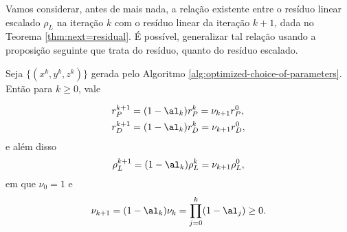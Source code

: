 


Vamos considerar, antes de mais nada, a relação existente entre o resíduo linear escalado $\rho_L$ na iteração $k$ com o resíduo 
linear da iteração $k+1$, dada no Teorema \ref{thm:next=residual}. É possível, generalizar tal relação usando a  proposição seguinte que trata do resíduo, quanto do resíduo escalado. 
\begin{prop}\label{prop:nu_k}
 Seja $\{(x^k,y^k,z^k)\}$ gerada pelo Algoritmo \ref{alg:optimized-choice-of-parameters}. Então para $k\geq0$, vale  

\begin{equation}
\label{eq:residual-norm-relation-nonscaled}
\begin{aligned}
 r_P^{k+1}  & = (1-\alk) r_P^{k} = \nu_{k+1}  r_P^{0}, \\
  r_D^{k+1}  & = (1-\alk) r_D^{k} = \nu_{k+1}  r_D^{0}, \\
\end{aligned}
\end{equation}
e além disso
\begin{equation}
\label{eq:residual-norm-relation}
 \rho_L^{k+1}  = (1-\alk) \rho_L^{k} = \nu_{k+1}  \rho_L^{0},
\end{equation}
em que  $\nu_0 = 1$ e 
\begin{equation}
	\label{eq:nu_k+1}
\nu_{k+1} = (1-\alk)\nuk = \prod_{j=0}^{k}(1-\al_j) \geq 0.
\end{equation}
\end{prop}

